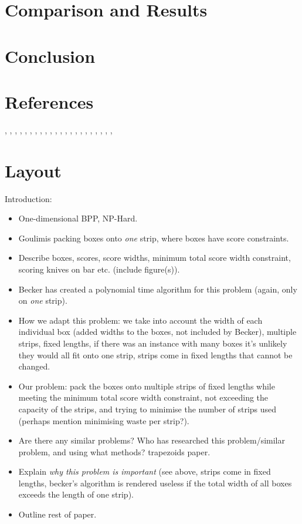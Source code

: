 \documentclass[oribibl]{llncs}
\begin{document}
\section{Comparison and Results}



\section{Conclusion}


\section{References}
\cite{becker2010}, \cite{becker2015}, \cite{coffman1978}, \cite{dosa2007}, \cite{eilon1971}, \cite{garey1979}, \cite{gilmore1961}, \cite{gilmore1963}, \cite{goulimis2004}, \cite{johnson1974worst}, \cite{johnson1974fast}, \cite{hung1978}, \cite{garey1972}, \cite{johnson1973}, \cite{karp1972}, \cite{korf2002}, \cite{lewis2009}, \cite{lewis2017}, \cite{lewis2011}, \cite{mahadev1994}, \cite{mahadev1995}, \cite{martello1990a}, \cite{martello1990b}

\section{Layout}
Introduction:
\begin{itemize}
	\item One-dimensional BPP, NP-Hard.
	\item Goulimis packing boxes onto \textit{one} strip, where boxes have score constraints.
	\item Describe boxes, scores, score widths, minimum total score width constraint, scoring knives on bar etc. (include figure(s)).
	\item Becker has created a polynomial time algorithm for this problem (again, only on \textit{one} strip).
	\item How we adapt this problem: we take into account the width of each individual box (added widths to the boxes, not included by Becker), multiple strips, fixed lengths, if there was an instance with many boxes it's unlikely they would all fit onto one strip, strips come in fixed lengths that cannot be changed.
	\item Our problem: pack the boxes onto multiple strips of fixed lengths while meeting the minimum total score width constraint, not exceeding the capacity of the strips, and trying to minimise the number of strips used (perhaps mention minimising waste per strip?).
	\item Are there any similar problems? Who has researched this problem/similar problem, and using what methods? \cite{lewis2017} trapezoids paper. 
	\item Explain \textit{why this problem is important} (see above, strips come in fixed lengths, becker's algorithm is rendered useless if the total width of all boxes exceeds the length of one strip).
	\item Outline rest of paper.	
\end{itemize}
\end{document}
